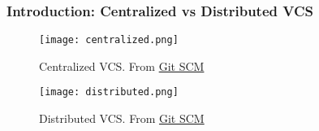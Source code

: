 \begin{frame}

\frametitle{Introduction: Centralized vs Distributed VCS}

\begin{multicols}{2}

\begin{figure}
\texttt{[image: centralized.png]}
\caption{Centralized VCS. From \href{https://git-scm.com/book/en/v2/Getting-Started-About-Version-Control}{Git SCM}}
\label{fig:centralized}
\end{figure}

\begin{figure}
\texttt{[image: distributed.png]}
\caption{Distributed VCS. From \href{https://git-scm.com/book/en/v2/Getting-Started-About-Version-Control}{Git SCM}}
\label{fig:distributed}
\end{figure}

\end{multicols}

\end{frame}

